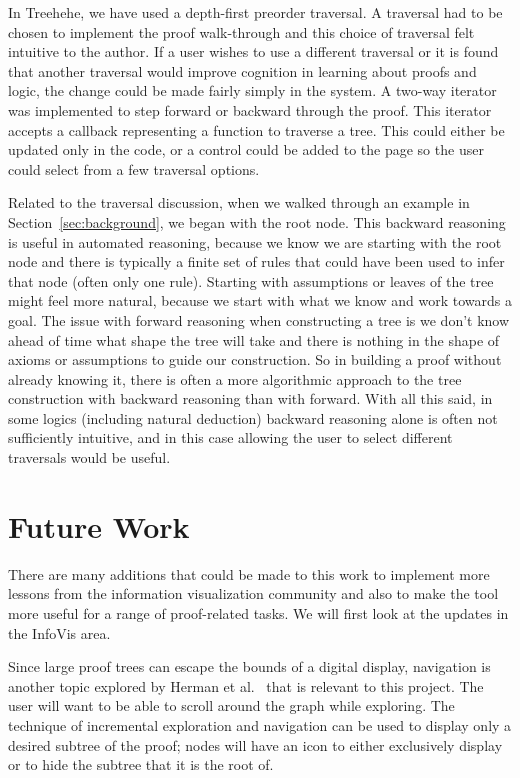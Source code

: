 \documentclass[journal]{vgtc}                %
\newcommand{\projectname}{Treehehe}
\begin{document}
In \projectname{}, we have used a depth-first preorder traversal. A traversal had to be chosen to implement the proof walk-through and this choice of traversal felt intuitive to the author. If a user wishes to use a different traversal or it is found that another traversal would improve cognition in learning about proofs and logic, the change could be made fairly simply in the system. A two-way iterator was implemented to step forward or backward through the proof. This iterator accepts a callback representing a function to traverse a tree. This could either be updated only in the code, or a control could be added to the page so the user could select from a few traversal options.

Related to the traversal discussion, when we walked through an example in Section~\ref{sec:background}, we began with the root node. This backward reasoning is useful in automated reasoning, because we know we are starting with the root node and there is typically a finite set of rules that could have been used to infer that node (often only one rule). Starting with assumptions or leaves of the tree might feel more natural, because we start with what we know and work towards a goal. The issue with forward reasoning when constructing a tree is we don't know ahead of time what shape the tree will take and there is nothing in the shape of axioms or assumptions to guide our construction. So in building a proof without already knowing it, there is often a more algorithmic approach to the tree construction with backward reasoning than with forward. With all this said, in some logics (including natural deduction) backward reasoning alone is often not sufficiently intuitive, and in this case allowing the user to select different traversals would be useful.

\section{Future Work}
\label{sec:future}

There are many additions that could be made to this work to implement more lessons from the information visualization community and also to make the tool more useful for a range of proof-related tasks. We will first look at the updates in the InfoVis area.

Since large proof trees can escape the bounds of a digital display, navigation is another topic explored by Herman et al.~\cite{graphvis-herman+melancon+marshall} that is relevant to this project. The user will want to be able to scroll around the graph while exploring. The technique of incremental exploration and navigation can be used to display only a desired subtree of the proof; nodes will have an icon to either exclusively display or to hide the subtree that it is the root of.
\end{document}
